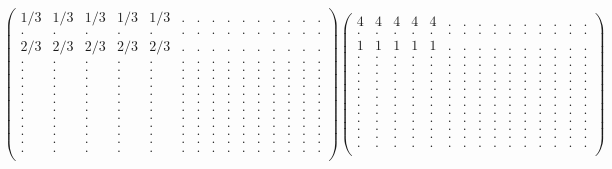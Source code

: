 \documentclass[12pt,a4paper]{amsart}
\begin{document}
\begin{align*}
\left(\begin{array}{rrrrrrrrrrrrrrr}%
1/3&1/3&1/3&1/3&1/3&.&.&.&.&.&.&.&.&.&.\\%
.&.&.&.&.&.&.&.&.&.&.&.&.&.&.\\%
2/3&2/3&2/3&2/3&2/3&.&.&.&.&.&.&.&.&.&.\\%
.&.&.&.&.&.&.&.&.&.&.&.&.&.&.\\%
.&.&.&.&.&.&.&.&.&.&.&.&.&.&.\\%
.&.&.&.&.&.&.&.&.&.&.&.&.&.&.\\%
.&.&.&.&.&.&.&.&.&.&.&.&.&.&.\\%
.&.&.&.&.&.&.&.&.&.&.&.&.&.&.\\%
.&.&.&.&.&.&.&.&.&.&.&.&.&.&.\\%
.&.&.&.&.&.&.&.&.&.&.&.&.&.&.\\%
.&.&.&.&.&.&.&.&.&.&.&.&.&.&.\\%
.&.&.&.&.&.&.&.&.&.&.&.&.&.&.\\%
.&.&.&.&.&.&.&.&.&.&.&.&.&.&.\\%
.&.&.&.&.&.&.&.&.&.&.&.&.&.&.\\%
.&.&.&.&.&.&.&.&.&.&.&.&.&.&.\\%
\end{array}\right)%
\left(\begin{array}{rrrrrrrrrrrrrrr}%
4&4&4&4&4&.&.&.&.&.&.&.&.&.&.\\%
.&.&.&.&.&.&.&.&.&.&.&.&.&.&.\\%
1&1&1&1&1&.&.&.&.&.&.&.&.&.&.\\%
.&.&.&.&.&.&.&.&.&.&.&.&.&.&.\\%
.&.&.&.&.&.&.&.&.&.&.&.&.&.&.\\%
.&.&.&.&.&.&.&.&.&.&.&.&.&.&.\\%
.&.&.&.&.&.&.&.&.&.&.&.&.&.&.\\%
.&.&.&.&.&.&.&.&.&.&.&.&.&.&.\\%
.&.&.&.&.&.&.&.&.&.&.&.&.&.&.\\%
.&.&.&.&.&.&.&.&.&.&.&.&.&.&.\\%
.&.&.&.&.&.&.&.&.&.&.&.&.&.&.\\%
.&.&.&.&.&.&.&.&.&.&.&.&.&.&.\\%
.&.&.&.&.&.&.&.&.&.&.&.&.&.&.\\%
.&.&.&.&.&.&.&.&.&.&.&.&.&.&.\\%
.&.&.&.&.&.&.&.&.&.&.&.&.&.&.\\%
\end{array}\right)%
\end{align*}
\end{document}
